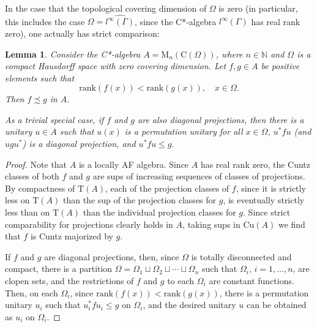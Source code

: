 \documentclass[12pt, oneside, psamsfonts]{amsart}
\newtheorem{lem}[thm]{Lemma}
\theoremstyle{definition}
\theoremstyle{remark}
\numberwithin{equation}{section}
\begin{document}

In the case that the topological covering dimension of $\Omega$ is zero (in particular, this includes the case $\Omega = \widehat{l^\infty(\Gamma)}$, since the C*-algebra $l^\infty(\Gamma)$ has real rank zero), one actually has strict comparison:
\begin{lem}\label{matrix-C-0}
Consider the C*-algebra $A=\mathrm{M}_n(\mathrm{C}(\Omega))$, where $n \in \mathbb{N}$ and $\Omega$ is a compact Hausdorff space with zero covering dimension. Let $f, g \in A$ be positive elements such that
$$\mathrm{rank}(f(x)) < \mathrm{rank}(g(x)), \quad x\in \Omega.$$ Then $f \precsim g$ in $A$.

As a trivial special case, if $f$ and $g$ are also diagonal projections, then there is a unitary $u \in A$ such that $u(x)$ is a permutation unitary for all $x \in \Omega$, $u^*f u$ (and $ugu^*$) is a diagonal projection, and $ u^*f u \leq g. $
\end{lem}
\begin{proof}
Note that $A$ is a locally AF algebra. 
Since $A$ has real rank zero, the Cuntz classes of both $f$ and $g$ are sups of increasing sequences of classes of projections. By compactness of $\mathrm{T}(A)$, each of the projection classes of $f$, since it is strictly less on $\mathrm{T}(A)$ than the sup of the projection classes for $g$, is eventually strictly less than on $\mathrm{T}(A)$ than the individual projection classes for $g$. Since strict comparability for projections clearly holds in $A$, taking sups in $\mathrm{Cu}(A)$ we find that $f$ is Cuntz majorized by $g$.





If $f$ and $g$ are diagonal projections, then, since $\Omega$ is totally disconnected and compact, there is a partition $\Omega = \Omega_1 \sqcup \Omega_2 \sqcup \cdots \sqcup \Omega_n$ such that $\Omega_i$, $i=1, ..., n$, are clopen sets, and the restrictions of $f$ and $g$ to each $\Omega_i$ are constant functions. Then, on each $\Omega_i$, since $\mathrm{rank}(f(x)) < \mathrm{rank}(g(x))$, there is a permutation unitary $u_i$ such that $u^*_i f u_i \leq g$ on $\Omega_i$, and the desired unitary $u$ can be obtained as $u_i$ on $\Omega_i$.
\end{proof}
\end{document}
